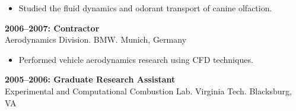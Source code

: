 \begin{itemize}
  \item Studied the fluid dynamics and odorant transport of canine olfaction.
\end{itemize}
\vspace{-0.2in}
\textbf{2006--2007:  Contractor}\\
Aerodynamics Division. BMW. Munich, Germany\\
\vspace{-0.35in}
\begin{itemize}
  \item Performed vehicle aerodynamics research using CFD techniques.
\end{itemize}
\vspace{-0.2in}
\textbf{2005--2006: Graduate Research Assistant}\\
Experimental and Computational Combustion Lab. Virginia Tech. Blacksburg, VA\\



